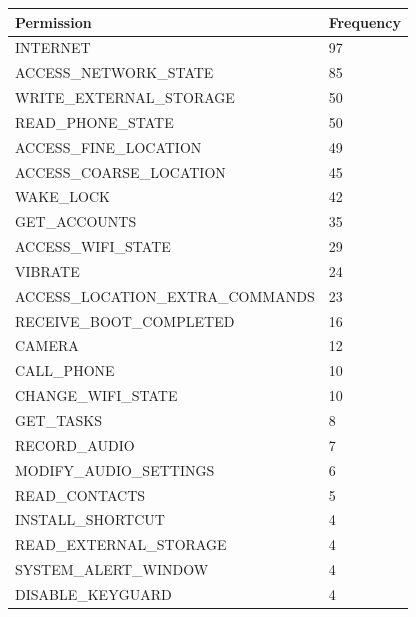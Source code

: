 \small 
\begin{table}[]
\centering
\begin{tabular}{|l|l|}
\hline
\textbf{Permission}               & \textbf{Frequency} \\ \hline
INTERNET                          & 97                 \\ \hline
ACCESS\_NETWORK\_STATE            & 85                 \\ \hline
WRITE\_EXTERNAL\_STORAGE          & 50                 \\ \hline
READ\_PHONE\_STATE                & 50                 \\ \hline
ACCESS\_FINE\_LOCATION            & 49                 \\ \hline
ACCESS\_COARSE\_LOCATION          & 45                 \\ \hline
WAKE\_LOCK                        & 42                 \\ \hline
GET\_ACCOUNTS                     & 35                 \\ \hline
ACCESS\_WIFI\_STATE               & 29                 \\ \hline
VIBRATE                           & 24                 \\ \hline
ACCESS\_LOCATION\_EXTRA\_COMMANDS & 23                 \\ \hline
RECEIVE\_BOOT\_COMPLETED          & 16                 \\ \hline
CAMERA                            & 12                 \\ \hline
CALL\_PHONE                       & 10                 \\ \hline
CHANGE\_WIFI\_STATE               & 10                 \\ \hline
GET\_TASKS                        & 8                  \\ \hline
RECORD\_AUDIO                     & 7                  \\ \hline
MODIFY\_AUDIO\_SETTINGS           & 6                  \\ \hline
READ\_CONTACTS                    & 5                  \\ \hline
INSTALL\_SHORTCUT                 & 4                  \\ \hline
READ\_EXTERNAL\_STORAGE           & 4                  \\ \hline
SYSTEM\_ALERT\_WINDOW             & 4                  \\ \hline
DISABLE\_KEYGUARD                 & 4                  \\ \hline

\end{tabular}
\end{table}
